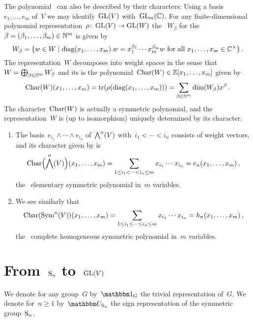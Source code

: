 \documentclass[a4paper,10pt]{scrartcl}
\begin{document}
The polynomial~{} can also be described by their characters:
Using a basis~$e_1, \dotsc, e_m$ of~$V$ we may identify~$\operatorname{GL}(V)$ with~$\operatorname{GL}_m(\mathbb{C})$.
For any finite-dimensional polynomial representation~$\rho \colon \operatorname{GL}(V) \to \operatorname{GL}(W)$ the ~$W_\beta$ for the ~$\beta = (\beta_1, \dotsc, \beta_m) \in \mathbb{N}^m$ is given by
\[
  W_\beta
  =
  \{
    w \in W
  \suchthat
    \text{$\diag(x_1, \dotsc, x_m).w = x_1^{\beta_1} \dotsm x_m^{\beta_m} w$ for all~$x_1, \dotsc, x_m \in \Complex^{\times}$}
  \} \,.
\]
The representation~$W$ decomposes into weight spaces in the sense that~$W = \bigoplus_{\beta \in \mathbb{N}^m} W_\beta$ and its  is the polynomial~$\operatorname{Char}(W) \in \mathbb{Z}[x_1, \dotsc, x_m]$ given by
\[
  \operatorname{Char}(W)(x_1, \dotsc, x_m)
  =
  \operatorname{tr}(\rho(\operatorname{diag}(x_1, \dotsc, x_m)))
  =
  \sum_{\beta \in \mathbb{N}^m} \dim(W_\beta) x^\beta \,.
\]
The character~$\operatorname{Char}(W)$ is actually a symmetric polynomial, and the representation~$W$ is (up to isomorphism) uniquely determined by its character.

\begin{example}
  \leavevmode
  \begin{enumerate}
    \item
      The basis~$e_{i_1} \wedge \dotsb \wedge e_{i_n}$ of~$\bigwedge^n(V)$ with~$i_1 < \dotsb < i_n$ consists of weight vectors, and its character given by is
      \[
        \operatorname{Char}\Bigl( \bigwedge^n(V) \Bigr)(x_1, \dotsc, x_m)
        =
        \sum_{1 \leq i_1 < \dotsb < i_n \leq m} x_{i_1} \dotsb x_{i_n}
        =
        e_n(x_1, \dotsc, x_m) \,,
      \]
      the~{} elementary symmetric polynomial in~$m$ variables.
    \item
      We see similarly that
      \[
        \operatorname{Char}(\operatorname{Sym}^n(V))(x_1, \dotsc, x_m)
        =
        \sum_{1 \leq i_1 \leq \dotsb \leq i_n \leq m} x_{i_1} \dotsb x_{i_n}
        =
        h_n(x_1, \dotsc, x_m) \,,
      \]
      the~{} complete homogeneous symmetric polynomial in~$m$ variables.
  \end{enumerate}
\end{example}





\section{From~$\operatorname{S}_n$ to~$\operatorname{GL}(V)$}

We denote for any group~$G$ by~$\trivrep_G$ the trivial representation of~$G$.
We denote for~$n \geq 1$ by~$\signrep_{\symm_n}$ the sign representation of the symmetric group~$\operatorname{S}_n$.
\end{document}
